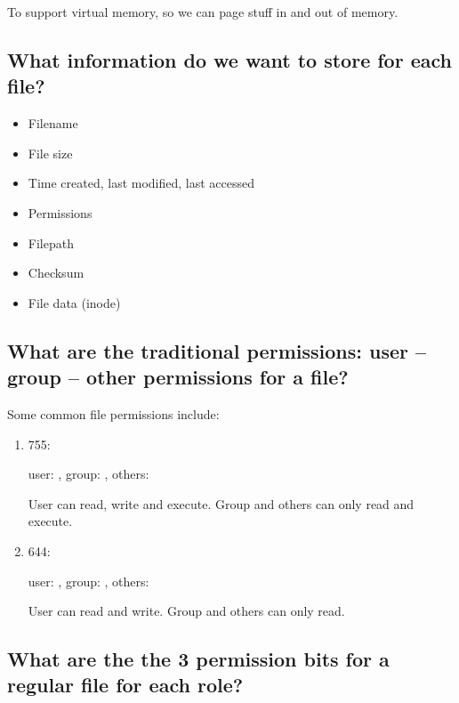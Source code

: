 To support virtual memory, so we can page stuff in and out of memory.

\subsection{What information do we want to store for each file?}\label{what-information-do-we-want-to-store-for-each-file}

\begin{itemize}
\tightlist
\item
  Filename
\item
  File size
\item
  Time created, last modified, last accessed
\item
  Permissions
\item
  Filepath
\item
  Checksum
\item
  File data (inode)
\end{itemize}

\subsection{What are the traditional permissions: user -- group -- other permissions for a file?}\label{what-are-the-traditional-permissions-user-group-other-permissions-for-a-file}

Some common file permissions include: 

\begin{enumerate}

\item 755: 

user: , group: , others: 

User can read, write and execute. Group and others can only read and execute. 

\item 644: 

user: , group: , others: 

User can read and write. Group and others can only read.

\end{enumerate}

\subsection{What are the the 3 permission bits for a regular file for each role?}

